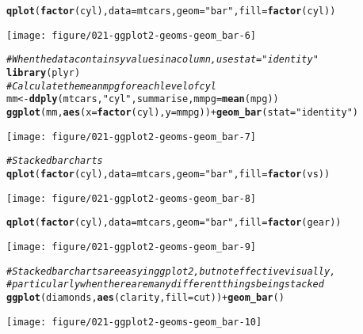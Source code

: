 \documentclass[a4paper,titlepage]{tufte-handout}\usepackage[]{graphicx}\usepackage[]{color}
\makeatletter
\def\maxwidth{ %
  \ifdim\Gin@nat@width>\linewidth
    \linewidth
  \else
    \Gin@nat@width
  \fi
}
\newcommand{\hlstr}[1]{\textcolor[rgb]{0.192,0.494,0.8}{#1}}%
\newcommand{\hlcom}[1]{\textcolor[rgb]{0.678,0.584,0.686}{\textit{#1}}}%
\newcommand{\hlopt}[1]{\textcolor[rgb]{0,0,0}{#1}}%
\newcommand{\hlstd}[1]{\textcolor[rgb]{0.345,0.345,0.345}{#1}}%
\newcommand{\hlkwb}[1]{\textcolor[rgb]{0.69,0.353,0.396}{#1}}%
\newcommand{\hlkwc}[1]{\textcolor[rgb]{0.333,0.667,0.333}{#1}}%
\newcommand{\hlkwd}[1]{\textcolor[rgb]{0.737,0.353,0.396}{\textbf{#1}}}%
\newenvironment{kframe}{%
 \def\at@end@of@kframe{}%
 \ifinner\ifhmode%
  \def\at@end@of@kframe{\end{minipage}}%
  \begin{minipage}{\columnwidth}%
 \fi\fi%
 \def\FrameCommand##1{\hskip\@totalleftmargin \hskip-\fboxsep
 \colorbox{shadecolor}{##1}\hskip-\fboxsep
     \hskip-\linewidth \hskip-\@totalleftmargin \hskip\columnwidth}%
 \MakeFramed {\advance\hsize-\width
   \@totalleftmargin\z@ \linewidth\hsize
   \@setminipage}}%
 {\par\unskip\endMakeFramed%
 \at@end@of@kframe}
\newenvironment{knitrout}{}{} %
\makeatother
\begin{document}
\begin{knitrout}
\begin{kframe}
\begin{alltt}
\hlkwd{qplot}\hlstd{(}\hlkwd{factor}\hlstd{(cyl),} \hlkwc{data}\hlstd{=mtcars,} \hlkwc{geom}\hlstd{=}\hlstr{"bar"}\hlstd{,} \hlkwc{fill}\hlstd{=}\hlkwd{factor}\hlstd{(cyl))}
\end{alltt}
\end{kframe}
\texttt{[image: figure/021-ggplot2-geoms-geom\_bar-6]} 
\begin{kframe}\begin{alltt}
\hlcom{# When the data contains y values in a column, use stat="identity"}
\hlkwd{library}\hlstd{(plyr)}
\hlcom{# Calculate the mean mpg for each level of cyl}
\hlstd{mm} \hlkwb{<-} \hlkwd{ddply}\hlstd{(mtcars,} \hlstr{"cyl"}\hlstd{, summarise,} \hlkwc{mmpg} \hlstd{=} \hlkwd{mean}\hlstd{(mpg))}
\hlkwd{ggplot}\hlstd{(mm,} \hlkwd{aes}\hlstd{(}\hlkwc{x} \hlstd{=} \hlkwd{factor}\hlstd{(cyl),} \hlkwc{y} \hlstd{= mmpg))} \hlopt{+} \hlkwd{geom_bar}\hlstd{(}\hlkwc{stat} \hlstd{=} \hlstr{"identity"}\hlstd{)}
\end{alltt}
\end{kframe}
\texttt{[image: figure/021-ggplot2-geoms-geom\_bar-7]} 
\begin{kframe}\begin{alltt}
\hlcom{# Stacked bar charts}
\hlkwd{qplot}\hlstd{(}\hlkwd{factor}\hlstd{(cyl),} \hlkwc{data}\hlstd{=mtcars,} \hlkwc{geom}\hlstd{=}\hlstr{"bar"}\hlstd{,} \hlkwc{fill}\hlstd{=}\hlkwd{factor}\hlstd{(vs))}
\end{alltt}
\end{kframe}
\texttt{[image: figure/021-ggplot2-geoms-geom\_bar-8]} 
\begin{kframe}\begin{alltt}
\hlkwd{qplot}\hlstd{(}\hlkwd{factor}\hlstd{(cyl),} \hlkwc{data}\hlstd{=mtcars,} \hlkwc{geom}\hlstd{=}\hlstr{"bar"}\hlstd{,} \hlkwc{fill}\hlstd{=}\hlkwd{factor}\hlstd{(gear))}
\end{alltt}
\end{kframe}
\texttt{[image: figure/021-ggplot2-geoms-geom\_bar-9]} 
\begin{kframe}\begin{alltt}
\hlcom{# Stacked bar charts are easy in ggplot2, but not effective visually,}
\hlcom{# particularly when there are many different things being stacked}
\hlkwd{ggplot}\hlstd{(diamonds,} \hlkwd{aes}\hlstd{(clarity,} \hlkwc{fill}\hlstd{=cut))} \hlopt{+} \hlkwd{geom_bar}\hlstd{()}
\end{alltt}
\end{kframe}
\texttt{[image: figure/021-ggplot2-geoms-geom\_bar-10]} 

\end{knitrout}
\end{document}
